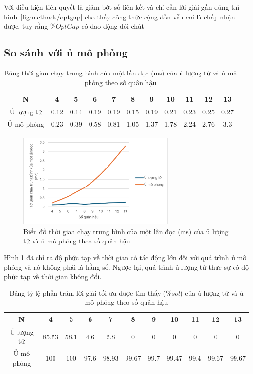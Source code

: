 Với điều kiện tiên quyết là giảm bớt số liên kết và chỉ cần lời giải gần đúng thì hình~\ref{fig:methods/optgap} cho thấy công thức cộng dồn vẫn coi là chấp nhận được, tuy rằng $\%OptGap$ có dao động đôi chút.

	\subsection{So sánh với ủ mô phỏng}
	
		\begin{table}[H]
		\centering
		\begin{tabular}{|c|c|c|c|c|c|c|c|c|c|c|}
			\hline
			N & 4 & 5 & 6 & 7 & 8 & 9 & 10 & 11 & 12 & 13 \\
			\hline
			Ủ lượng tử & 0.12 & 0.14 & 0.19 & 0.19 & 0.15 & 0.19 & 0.21 & 0.23 & 0.25 & 0.27 \\
			\hline
			Ủ mô phỏng & 0.23 & 0.39 & 0.58 & 0.81 & 1.05 & 1.37 & 1.78 & 2.24 & 2.76 & 3.3 \\
			\hline
		\end{tabular}
		
		
		\caption{Bảng thời gian chạy trung bình của một lần đọc (ms)  của ủ lượng tử và ủ mô phỏng theo số quân hậu}
		\label{tab:SA_QA/t_f}
	\end{table}
	
	\begin{figure}[H]
		\centering
		\includegraphics[width=0.7\textwidth]{images/SA_QA/t_f.png}
		\caption{Biểu đồ thời gian chạy trung bình của một lần đọc (ms)  của ủ lượng tử và ủ mô phỏng theo số quân hậu}
		\label{fig:SA_QA/t_f}
	\end{figure}
	Hình \ref{fig:SA_QA/t_f} đã chỉ ra độ phức tạp về thời gian có tác động lớn đối với quá trình ủ mô phỏng và nó không phải là hằng số. Ngược lại, quá trình ủ lượng tử thực sự có độ phức tạp về thời gian không đổi.
	
		\begin{table}[H]
		\centering
		\begin{tabular}{|c|c|c|c|c|c|c|c|c|c|c|}
			\hline
			N & 4 & 5 & 6 & 7 & 8 & 9 & 10 & 11 & 12 & 13 \\
			\hline
			Ủ lượng tử & 85.53 & 58.1 & 4.6 & 2.8 & 0 & 0 & 0 & 0 & 0 & 0 \\
			\hline
			Ủ mô phỏng & 100 & 100 & 97.6 & 98.93 & 99.67 & 99.7 & 99.47 & 99.4 & 99.67 & 99.67 \\
			\hline
		\end{tabular}
		
		
		\caption{Bảng tỷ lệ phần trăm lời giải tối ưu được tìm thấy ($\%sol$)  của ủ lượng tử và ủ mô phỏng theo số quân hậu}
		\label{tab:SA_QA/sol}
	\end{table}
	
